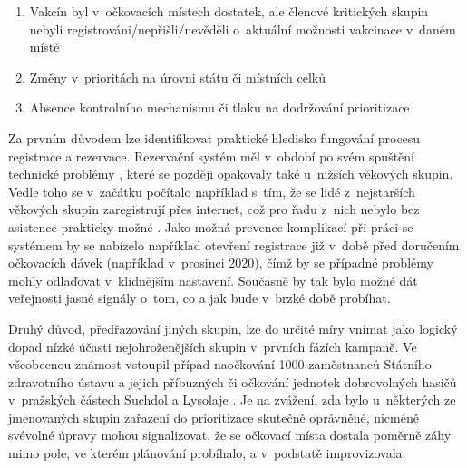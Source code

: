 \begin{enumerate}
\item Vakcín byl v~očkovacích místech dostatek, ale členové kritických skupin nebyli registrováni/nepřišli/nevěděli o~aktuální možnosti vakcinace v~daném místě \cite{logo_nahoda, lochar_karban} 
\item Změny v~prioritách na úrovni státu či místních celků \cite{logo_logistika, logo_pardubice}
\item Absence kontrolního mechanismu či tlaku na dodržování prioritizace \cite{logo_predbihani, lochar_karban}
\end{enumerate}


Za prvním důvodem lze identifikovat praktické hledisko fungování procesu registrace a rezervace.
Rezervační systém měl v~období po svém spuštění technické problémy \cite{logoc_seniori_zapsani, logoc_stres}, které se později opakovaly také u~nižších věkových skupin. 
Vedle toho se v~začátku počítalo například s~tím, že se lidé z~nejstarších věkových skupin zaregistrují přes internet, což pro řadu z~nich nebylo bez asistence prakticky možné \cite{seniori_registrace_internet}.
%
Jako možná prevence komplikací při práci se systémem by se nabízelo například otevření registrace již v~době před doručením očkovacích dávek (například v~prosinci 2020), čímž by se případné problémy mohly odlaďovat v~klidnějším nastavení. %
Současně by tak bylo možné dát veřejnosti jasné signály o~tom, co a jak bude v~brzké době probíhat.

Druhý důvod, předřazování jiných skupin, lze do určité míry vnímat jako logický dopad nízké účasti nejohroženějších skupin v~prvních fázích kampaně.
%
Ve všeobecnou známost vstoupil případ naočkování 1000 zaměstnanců Státního zdravotního ústavu a jejich příbuzných či očkování jednotek dobrovolných hasičů v~pražských částech Suchdol a Lysolaje \cite{logoc_nebudu, logoc_hasici}. Je na zvážení, zda bylo u~některých ze jmenovaných skupin zařazení do prioritizace skutečně oprávněné, nicméně svévolné úpravy mohou signalizovat, že se očkovací místa dostala poměrně záhy mimo pole, ve kterém plánování probíhalo, a v~podstatě improvizovala. 

